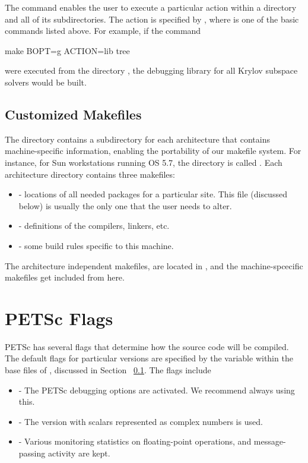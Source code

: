 {{{The  command enables the user to execute a particular action
within a directory and all of its subdirectories.  The action is specified
by , where  is one of the basic commands
listed above. For example, if the command
\begin{tabbing}
   make BOPT=g ACTION=lib tree
\end{tabbing}
were executed from the directory ,
the debugging library for all Krylov subspace solvers would be built.

\subsection{Customized Makefiles}
\label{sec_custom}

The directory  contains a subdirectory for each 
architecture that contains machine-specific information, enabling the
portability of our makefile system.
For instance, for Sun workstations running OS 5.7, the 
directory is called .  Each architecture directory contains
three makefiles:
\begin{itemize}
\item {} - locations of all needed packages for a particular site. 
      This file (discussed below) is usually the only one that the user 
      needs to alter.
\item {} - definitions of the compilers, linkers, etc.
\item {} - some build rules specific to this machine.
\end{itemize}

The architecture independent makefiles, are located in
, and the machine-spcecific
makefiles get included from here.

\section{PETSc Flags}
\label{sec_makeflags}

PETSc has several flags that determine how the source code will be
compiled.  The default flags for particular versions are specified by
the variable  within the base files of , discussed in Section
~\ref{sec_custom}.  The flags include
\begin{itemize}
\item {} - The PETSc debugging options are activated. We 
      recommend always using this. 
\item {} - The version with scalars represented 
      as complex numbers is used. 
\item {} - Various monitoring statistics on floating-point operations,
      and message-passing activity are kept. 
\end{itemize}

}}}
